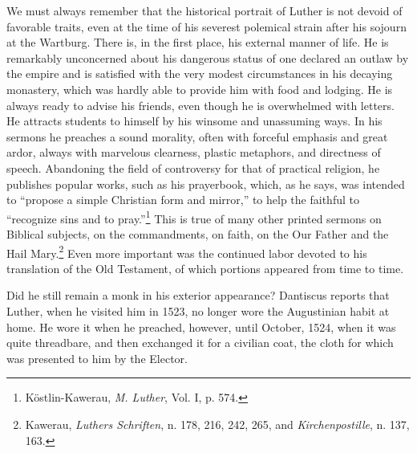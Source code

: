 We must always remember that the historical portrait of Luther
is not devoid of favorable traits, even at the time of his severest
polemical strain after his sojourn at the Wartburg. There is, in the
first place, his external manner of life. He is remarkably unconcerned
about his dangerous status of one declared an outlaw by the empire
and is satisfied with the very modest circumstances in his decaying
monastery, which was hardly able to provide him with food and
lodging. He is always ready to advise his friends, even though he is
overwhelmed with letters. He attracts students to himself by his
winsome and unassuming ways. In his sermons he preaches a sound
morality, often with forceful emphasis and great ardor, always with
marvelous clearness, plastic metaphors, and directness of speech.
Abandoning the field of controversy for that of practical religion, he
publishes popular works, such as his prayerbook, which, as he says,
was intended to “propose a simple Christian form and mirror,”
to help the faithful to “recognize sins and to pray.”\footnote
{Köstlin-Kawerau, \textit{M. Luther}, Vol. I, p. 574.}
This is true of many other printed sermons on Biblical subjects, on the commandments,
on faith, on the Our Father and the Hail Mary.\footnote
{Kawerau, \textit{Luthers Schriften}, n. 178, 216, 242, 265, and \textit{Kirchenpostille}, n. 137, 163.}
Even more important was the continued labor devoted to his translation of the
Old Testament, of which portions appeared from time to time.

Did he still remain a monk in his exterior appearance? Dantiscus
reports that Luther, when he visited him in 1523, no longer wore
the Augustinian habit at home. He wore it when he preached, however,
until October, 1524, when it was quite threadbare, and then exchanged it
for a civilian coat, the cloth for which was presented to
him by the Elector.
